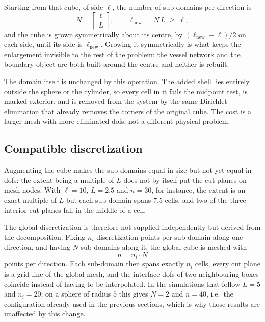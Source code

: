 Starting from that cube, of side $\ell$, the number of sub-domains per direction is
\[
N = \left\lceil \frac{\ell}{L} \right\rceil ,
\qquad
\ell_{\text{new}} = N\,L \;\geq\; \ell ,
\]
and the cube is grown symmetrically about its centre, by $(\ell_{\text{new}} - \ell)/2$ on each side, until its side is $\ell_{\text{new}}$. Growing it symmetrically is what keeps the enlargement invisible to the rest of the problem: the vessel network and the boundary object are both built around the centre and neither is rebuilt.

The domain itself is unchanged by this operation. The added shell lies entirely outside the sphere or the cylinder, so every cell in it fails the midpoint test, is marked exterior, and is removed from the system by the same Dirichlet elimination that already removes the corners of the original cube. The cost is a larger mesh with more eliminated dofs, not a different physical problem.

\subsection*{Compatible discretization}

Augmenting the cube makes the sub-domains equal in size but not yet equal in dofs: the extent being a multiple of $L$ does not by itself put the cut planes on mesh nodes. With $\ell = 10$, $L = 2.5$ and $n = 30$, for instance, the extent is an exact multiple of $L$ but each sub-domain spans $7.5$ cells, and two of the three interior cut planes fall in the middle of a cell.

The global discretization is therefore not supplied independently but derived from the decomposition. Fixing $n_i$ discretization points per sub-domain along one direction, and having $N$ sub-domains along it, the global cube is meshed with
\[
n = n_i \cdot N
\]
points per direction. Each sub-domain then spans exactly $n_i$ cells, every cut plane is a grid line of the global mesh, and the interface dofs of two neighbouring boxes coincide instead of having to be interpolated. In the simulations that follow $L = 5$ and $n_i = 20$; on a sphere of radius $5$ this gives $N = 2$ and $n = 40$, i.e.\ the configuration already used in the previous sections, which is why those results are unaffected by this change.
